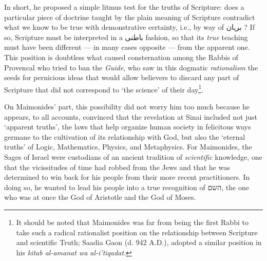 \documentclass[12pt]{article}
\begin{document}
In short, he proposed a simple litmus test for the truths of Scripture: does a particular piece of doctrine taught by the plain meaning of Scripture contradict what we know to be true with demonstrative certainty, i.e., by way of {\myfont برہان} ? If so, Scripture must be interpreted in a {\myfont باطنی} fashion, so that its \emph{true} teaching must have been different --- in many cases opposite --- from the apparent one. This position is doubtless what caused consternation among the Rabbis of Provencal who tried to ban the \emph{Guide}, who saw in this dogmatic \emph{rationalism} the seeds for pernicious ideas that would allow believers to discard any part of Scripture that did not correspond to `the science' of their day\footnote{It should be noted that Maimonides was far from being the first Rabbi to take such a radical rationalist position on the relationship between Scripture and scientific Truth; Saadia Gaon (d. 942 A.D.), adopted a similar position in his \emph{kitab al-amanat wa al-i'tiqadat}.}.

On Maimonides' part, this possibility did not worry him too much because he appears, to all accounts, convinced that the revelation at Sinai included not just `apparent truths', the laws that help organize human society in felicitous ways germane to the cultivation of its relationship with God, but also the `eternal truths' of Logic, Mathematics, Physics, and Metaphysics. For Maimonides, the Sages of Israel were custodians of an ancient tradition of \emph{scientific} knowledge, one that the vicissitudes of time had robbed from the Jews and that he was determined to win back for his people from their more recent practitioners. In doing so, he wanted to lead his people into a true recognition of {\nyfont השם}, the one who was at once the God of Aristotle and the God of Moses.
\end{document}
